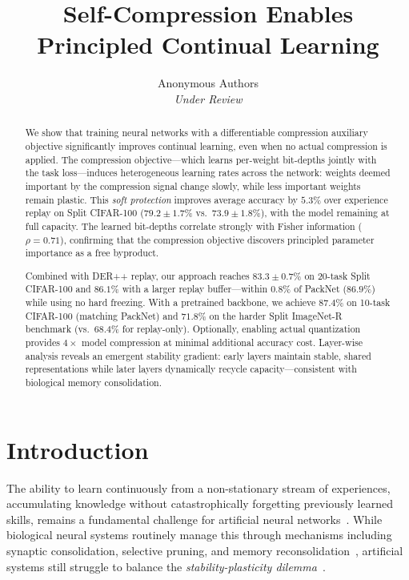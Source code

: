 \documentclass[11pt]{article}
\title{Self-Compression Enables Principled Continual Learning}
\author{
Anonymous Authors\\
\textit{Under Review}
}
\date{}
\begin{document}
\maketitle

\begin{abstract}
We show that training neural networks with a differentiable compression auxiliary objective significantly improves continual learning, even when no actual compression is applied.
The compression objective---which learns per-weight bit-depths jointly with the task loss---induces heterogeneous learning rates across the network: weights deemed important by the compression signal change slowly, while less important weights remain plastic.
This \textit{soft protection} improves average accuracy by $5.3\%$ over experience replay on Split CIFAR-100 ($79.2 \pm 1.7\%$ vs.\ $73.9 \pm 1.8\%$), with the model remaining at full capacity.
The learned bit-depths correlate strongly with Fisher information ($\rho = 0.71$), confirming that the compression objective discovers principled parameter importance as a free byproduct.

Combined with DER++ replay, our approach reaches $83.3 \pm 0.7\%$ on 20-task Split CIFAR-100 and $86.1\%$ with a larger replay buffer---within $0.8\%$ of PackNet ($86.9\%$) while using no hard freezing.
With a pretrained backbone, we achieve $87.4\%$ on 10-task CIFAR-100 (matching PackNet) and $71.8\%$ on the harder Split ImageNet-R benchmark (vs.\ $68.4\%$ for replay-only).
Optionally, enabling actual quantization provides $4\times$ model compression at minimal additional accuracy cost.
Layer-wise analysis reveals an emergent stability gradient: early layers maintain stable, shared representations while later layers dynamically recycle capacity---consistent with biological memory consolidation.
\end{abstract}

\section{Introduction}
\label{sec:intro}

The ability to learn continuously from a non-stationary stream of experiences, accumulating knowledge without catastrophically forgetting previously learned skills, remains a fundamental challenge for artificial neural networks~\citep{mccloskey1989catastrophic, french1999catastrophic}.
While biological neural systems routinely manage this through mechanisms including synaptic consolidation, selective pruning, and memory reconsolidation~\citep{dudai2012restless, tononi2014sleep}, artificial systems still struggle to balance the \textit{stability-plasticity dilemma}~\citep{grossberg1980neural}.
\end{document}
